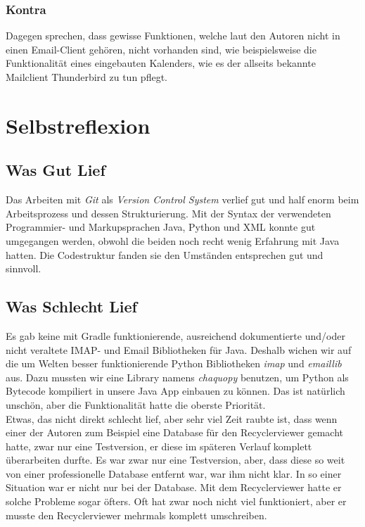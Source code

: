 \documentclass[a4paper,11pt]{article}
\begin{document}
\subsubsection{Kontra}
Dagegen sprechen, dass gewisse Funktionen, welche laut den Autoren nicht in einen Email-Client gehören, nicht vorhanden sind, wie beispielsweise die Funktionalität eines eingebauten Kalenders, wie es der allseits bekannte Mailclient Thunderbird zu tun pflegt.\cite{thunderbird}

\section{Selbstreflexion}

\subsection{Was Gut Lief}
Das Arbeiten mit \textit{Git} als \textit{Version Control System} verlief gut und half enorm beim Arbeitsprozess und dessen Strukturierung. Mit der Syntax der verwendeten Programmier- und Markupsprachen Java, Python und XML konnte gut umgegangen werden, obwohl die beiden noch recht wenig Erfahrung mit Java hatten. Die Codestruktur fanden sie den Umständen entsprechen gut und sinnvoll.
\subsection{Was Schlecht Lief}
Es gab keine mit Gradle funktionierende, ausreichend dokumentierte und/oder nicht veraltete IMAP- und Email Bibliotheken für Java. Deshalb wichen wir auf die um Welten besser funktionierende Python Bibliotheken \textit{imap} und \textit{emaillib} aus. Dazu mussten wir eine Library namens \textit{chaquopy} benutzen, um Python als Bytecode kompiliert in unsere Java App einbauen zu können. Das ist natürlich unschön, aber die Funktionalität hatte die oberste Priorität.\\

Etwas, das nicht direkt schlecht lief, aber sehr viel Zeit raubte ist, dass wenn einer der Autoren zum Beispiel eine Database für den Recyclerviewer gemacht hatte, zwar nur eine Testversion, 
er diese im späteren Verlauf komplett überarbeiten durfte. Es war zwar nur eine Testversion, aber, dass diese so weit von einer professionelle Database entfernt war, war ihm nicht klar. 
In so einer Situation war er nicht nur bei der Database. Mit dem Recyclerviewer hatte er solche Probleme sogar öfters. Oft hat zwar noch nicht viel funktioniert, aber er musste den Recyclerviewer
mehrmals komplett umschreiben. \\
\end{document}
